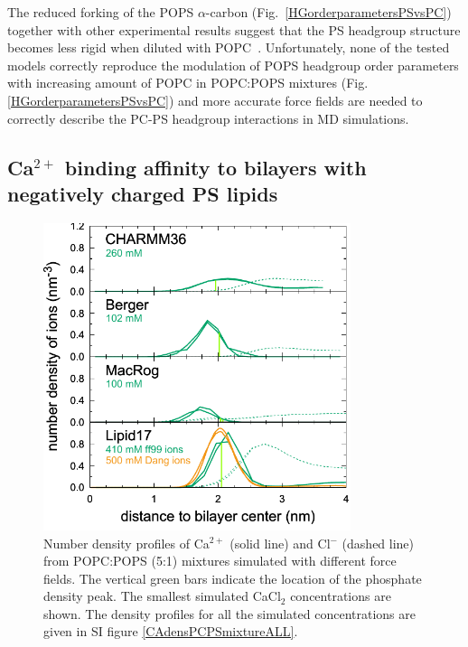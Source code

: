 \documentclass[aps,prl,superscriptaddress,twocolumn]{revtex4}
\begin{document}
The reduced forking of the POPS $\alpha$-carbon (Fig.~\ref{HGorderparametersPSvsPC})
together with other experimental results suggest that the PS headgroup structure becomes less rigid when diluted with
POPC~\cite{browning80,buldt81,roux90,roux91,scherer87}.
Unfortunately, none of the tested models correctly reproduce the modulation of POPS headgroup order
parameters with increasing amount of POPC in POPC:POPS mixtures (Fig. \ref{HGorderparametersPSvsPC})
and more accurate force fields are needed
to correctly describe the PC-PS headgroup interactions in MD simulations.

\subsection{Ca$^{2+}$ binding affinity to bilayers with negatively charged PS lipids}
\begin{figure}[tb]
  \centering
  \includegraphics[width=9cm]{../Figs/CAdensPCPSmixtureLOWconsformatted.pdf}
  \caption{\label{CAdensPCPSmixture}
    Number density profiles of Ca$^{2+}$ (solid line) and Cl$^-$ (dashed line) from POPC:POPS (5:1) mixtures
    simulated with different force fields. The vertical green bars indicate the location of the phosphate density peak.
    The smallest simulated CaCl$_2$ concentrations are shown.
    The density profiles for all the simulated concentrations are given in SI figure \ref{CAdensPCPSmixtureALL}.
  }
\end{figure}
\end{document}
